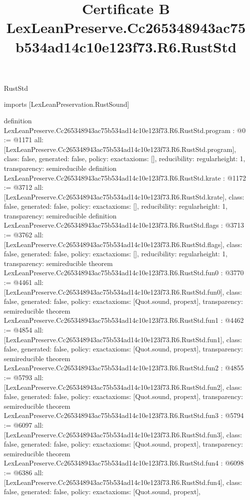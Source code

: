 \begin{lexlean}{RustStd}
\title{Certificate B LexLeanPreserve.Cc265348943ac75b534ad14c10e123f73.R6.RustStd}
\begin{coremodule}
imports [LexLeanPreservation.RustSound]

definition LexLeanPreserve.Cc265348943ac75b534ad14c10e123f73.R6.RustStd.program : @0 := @1171 {
  all: [LexLeanPreserve.Cc265348943ac75b534ad14c10e123f73.R6.RustStd.program],
  class: false,
  generated: false,
  policy: exact{axioms: []},
  reducibility: regular{height: 1},
  transparency: semireducible
}
definition LexLeanPreserve.Cc265348943ac75b534ad14c10e123f73.R6.RustStd.krate : @1172 := @3712 {
  all: [LexLeanPreserve.Cc265348943ac75b534ad14c10e123f73.R6.RustStd.krate],
  class: false,
  generated: false,
  policy: exact{axioms: []},
  reducibility: regular{height: 1},
  transparency: semireducible
}
definition LexLeanPreserve.Cc265348943ac75b534ad14c10e123f73.R6.RustStd.flags : @3713 := @3762 {
  all: [LexLeanPreserve.Cc265348943ac75b534ad14c10e123f73.R6.RustStd.flags],
  class: false,
  generated: false,
  policy: exact{axioms: []},
  reducibility: regular{height: 1},
  transparency: semireducible
}
theorem LexLeanPreserve.Cc265348943ac75b534ad14c10e123f73.R6.RustStd.fun0 : @3770 := @4461 {
  all: [LexLeanPreserve.Cc265348943ac75b534ad14c10e123f73.R6.RustStd.fun0],
  class: false,
  generated: false,
  policy: exact{axioms: [Quot.sound, propext]},
  transparency: semireducible
}
theorem LexLeanPreserve.Cc265348943ac75b534ad14c10e123f73.R6.RustStd.fun1 : @4462 := @4854 {
  all: [LexLeanPreserve.Cc265348943ac75b534ad14c10e123f73.R6.RustStd.fun1],
  class: false,
  generated: false,
  policy: exact{axioms: [Quot.sound, propext]},
  transparency: semireducible
}
theorem LexLeanPreserve.Cc265348943ac75b534ad14c10e123f73.R6.RustStd.fun2 : @4855 := @5793 {
  all: [LexLeanPreserve.Cc265348943ac75b534ad14c10e123f73.R6.RustStd.fun2],
  class: false,
  generated: false,
  policy: exact{axioms: [Quot.sound, propext]},
  transparency: semireducible
}
theorem LexLeanPreserve.Cc265348943ac75b534ad14c10e123f73.R6.RustStd.fun3 : @5794 := @6097 {
  all: [LexLeanPreserve.Cc265348943ac75b534ad14c10e123f73.R6.RustStd.fun3],
  class: false,
  generated: false,
  policy: exact{axioms: [Quot.sound, propext]},
  transparency: semireducible
}
theorem LexLeanPreserve.Cc265348943ac75b534ad14c10e123f73.R6.RustStd.fun4 : @6098 := @6386 {
  all: [LexLeanPreserve.Cc265348943ac75b534ad14c10e123f73.R6.RustStd.fun4],
  class: false,
  generated: false,
  policy: exact{axioms: [Quot.sound, propext]},
}
\end{coremodule}
\end{lexlean}
